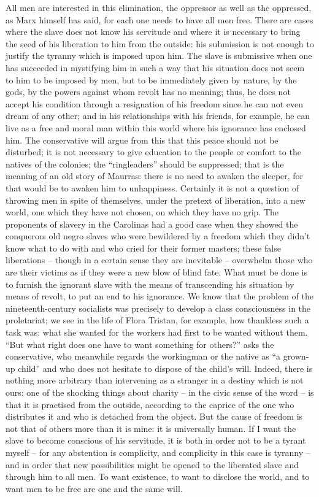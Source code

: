 \documentclass[11pt]{article}
\begin{document}
{{All men are interested in this elimination, the oppressor as well as the oppressed, as Marx himself has said, for each one needs to have all men free. There are cases where the slave does not know his servitude and where it is necessary to bring the seed of his liberation to him from the outside: his submission is not enough to justify the tyranny which is imposed upon him. The slave is submissive when one has succeeded in mystifying him in such a way that his situation does not seem to him to be imposed by men, but to be immediately given by nature, by the gods, by the powers against whom revolt has no meaning; thus, he does not accept his condition through a resignation of his freedom since he can not even dream of any other; and in his relationships with his friends, for example, he can live as a free and moral man within this world where his ignorance has enclosed him. The conservative will argue from this that this peace should not be disturbed; it is not necessary to give education to the people or comfort to the natives of the colonies; the “ringleaders” should be suppressed; that is the meaning of an old story of Maurras: there is no need to awaken the sleeper, for that would be to awaken him to unhappiness. Certainly it is not a question of throwing men in spite of themselves, under the pretext of liberation, into a new world, one which they have not chosen, on which they have no grip. The proponents of slavery in the Carolinas had a good case when they showed the conquerors old negro slaves who were bewildered by a freedom which they didn’t know what to do with and who cried for their former masters; these false liberations – though in a certain sense they are inevitable – overwhelm those who are their victims as if they were a new blow of blind fate. What must be done is to furnish the ignorant slave with the means of transcending his situation by means of revolt, to put an end to his ignorance. We know that the problem of the nineteenth-century socialists was precisely to develop a class consciousness in the proletariat; we see in the life of Flora Tristan, for example, how thankless such a task was: what she wanted for the workers had first to be wanted without them. “But what right does one have to want something for others?” asks the conservative, who meanwhile regards the workingman or the native as “a grown-up child” and who does not hesitate to dispose of the child’s will. Indeed, there is nothing more arbitrary than intervening as a stranger in a destiny which is not ours: one of the shocking things about charity – in the civic sense of the word – is that it is practised from the outside, according to the caprice of the one who distributes it and who is detached from the object. But the cause of freedom is not that of others more than it is mine: it is universally human. If I want the slave to become conscious of his servitude, it is both in order not to be a tyrant myself – for any abstention is complicity, and complicity in this case is tyranny – and in order that new possibilities might be opened to the liberated slave and through him to all men. To want existence, to want to disclose the world, and to want men to be free are one and the same will.

}}
\end{document}

